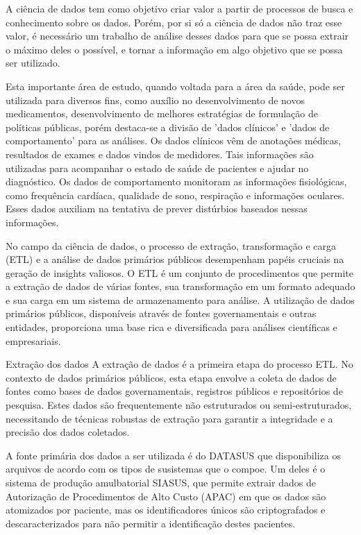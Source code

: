 \documentclass[article,a4paper,12pt,brazil,sumario=tradicional]{abntex2}
\begin{document}
A ciência de dados tem como objetivo criar valor a partir de processos de busca e conhecimento sobre os dados. Porém, por si só a ciência de dados não traz esse valor, é necessário um trabalho de análise desses dados para que se possa extrair o máximo deles o possível, e tornar a informação em algo objetivo que se possa ser utilizado.

Esta importante área de estudo, quando voltada para a área da saúde, pode ser utilizada para diversos fins, como auxílio no desenvolvimento de novos medicamentos, desenvolvimento de melhores estratégias de formulação de políticas públicas, porém destaca-se a divisão de 'dados clínicos' e 'dados de comportamento' para as análises. Os dados clínicos vêm de anotações médicas, resultados de exames e dados vindos de medidores. Tais informações são utilizadas para acompanhar o estado de saúde de pacientes e ajudar no diagnóstico. Os dados de comportamento monitoram as informações fisiológicas, como frequência cardíaca, qualidade de sono, respiração e informações oculares. Esses dados auxiliam na tentativa de prever distúrbios baseados nessas informações.

No campo da ciência de dados, o processo de extração, transformação e carga (ETL) e a análise de dados primários públicos desempenham papéis cruciais na geração de insights valiosos. O ETL é um conjunto de procedimentos que permite a extração de dados de várias fontes, sua transformação em um formato adequado e sua carga em um sistema de armazenamento para análise. A utilização de dados primários públicos, disponíveis através de fontes governamentais e outras entidades, proporciona uma base rica e diversificada para análises científicas e empresariais.


Extração dos dados
A extração de dados é a primeira etapa do processo ETL. No contexto de dados primários públicos, esta etapa envolve a coleta de dados de fontes como bases de dados governamentais, registros públicos e repositórios de pesquisa. Estes dados são frequentemente não estruturados ou semi-estruturados, necessitando de técnicas robustas de extração para garantir a integridade e a precisão dos dados coletados.

A fonte primária dos dados a ser utilizada é do DATASUS que disponibiliza os arquivos de acordo com os tipos de susistemas que o compoe. Um deles é o sistema de produção amulbatorial SIASUS, que permite extrair dados de Autorização de Procedimentos de Alto Custo (APAC) em que os dados são atomizados por paciente, mas os identificadores únicos são criptografados e descaracterizados para não permitir a identificação destes pacientes.
\end{document}
